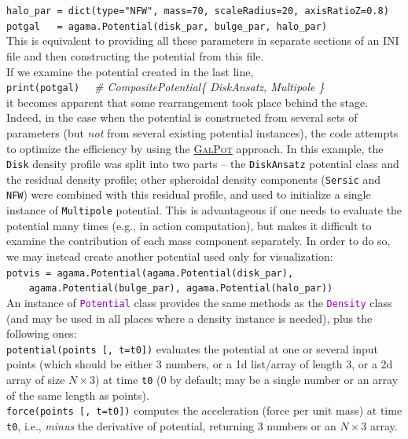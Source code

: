 \documentclass[12pt]{article}
\newcommand{\ttt}[1]{\textcolor{darkviolet}{\texttt{#1}}}
\newcommand{\ppp}[1]{\textcolor{darkolive} {\texttt{#1}}}
\begin{document}
\texttt{halo_par = dict(type="NFW", mass=70, scaleRadius=20, axisRatioZ=0.8)}\\
\texttt{potgal~~~= agama.Potential(disk_par, bulge_par, halo_par)}\\
This is equivalent to providing all these parameters in separate sections of an INI file and then constructing the potential from this file.\\[2mm]
If we examine the potential created in the last line,\\
\texttt{print(potgal)}  \textit{\color{Sepia} \ \ \# CompositePotential\{ DiskAnsatz, Multipole \}}\\
it becomes apparent that some rearrangement took place behind the stage. Indeed, in the case when the potential is constructed from several sets of parameters (but \textit{not} from several existing potential instances), the code attempts to optimize the efficiency by using the \hyperref[sec:PotentialGalpot]{\textsc{GalPot}} approach. In this example, the \ppp{Disk} density profile was split into two parts -- the \ppp{DiskAnsatz} potential class and the residual density profile; other spheroidal density components (\ppp{Sersic} and \ppp{NFW}) were combined with this residual profile, and used to initialize a single instance of \ppp{Multipole} potential. This is advantageous if one needs to evaluate the potential many times (e.g., in action computation), but makes it difficult to examine the contribution of each mass component separately. In order to do so, we may instead create another potential used only for visualization:\\
\texttt{potvis~= agama.Potential(agama.Potential(disk_par), }\\
\texttt{\mbox{}~~~~agama.Potential(bulge_par), agama.Potential(halo_par))}\\[2mm]
An instance of \ttt{Potential} class provides the same methods as the \ttt{Density} class (and may be used in all places where a density instance is needed), plus the following ones:\\[2mm]
\texttt{potential(points [, t=t0])} evaluates the potential at one or several input points (which should be either 3 numbers, or a 1d list/array of length 3, or a 2d array of size $N\times3$) at time \texttt{t0} (0 by default; may be a single number or an array of the same length as points).\\[2mm]
\texttt{force(points [, t=t0])} computes the acceleration (force per unit mass) at time \texttt{t0}, i.e., \textit{minus} the derivative of potential, returning 3 numbers or an $N\times3$ array.\\[2mm]
\end{document}
